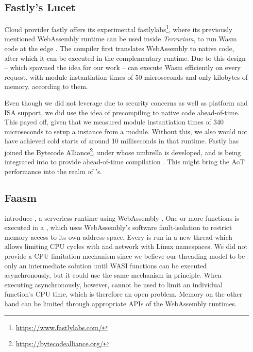 
\subsection{Fastly's Lucet}

Cloud provider fastly offers its experimental fastlylabs\footnote{\url{https://www.fastlylabs.com/}}, where its previously mentioned  WebAssembly runtime can be used inside \emph{Terrarium}, to run Wasm code at the edge \cite{fastly2019}. The  compiler first translates WebAssembly to native code, after which it can be executed in the complementary runtime. Due to this design -- which spawned the idea for our work --  can execute Wasm efficiently on every request, with module instantiation times of 50 microseconds and only kilobytes of memory, according to them.

Even though we did not leverage  due to security concerns as well as platform and ISA support, we did use the idea of precompiling to native code ahead-of-time. This payed off, given that we measured module instantiation times of 340 microseconds to setup a  instance from a module. Without this, we also would not have achieved cold starts of around 10 milliseconds in that runtime.
Fastly has joined the Bytecode Alliance\footnote{\url{https://bytecodealliance.org/}}, under whose umbrella  is developed, and  is being integrated into  to provide ahead-of-time compilation \cite{Hickey2020}. This might bring the AoT performance into the realm of 's.

\subsection{Faasm}

\citeauthor{Shillaker2020} introduce , a serverless runtime using WebAssembly \cite{Shillaker2020}. One or more functions is executed in a , which uses WebAssembly's software fault-isolation to restrict memory access to its own address space. Every  is run in a new thread which allows limiting CPU cycles with  and network with Linux namespaces.
We did not provide a CPU limitation mechanism since we believe our threading model to be only an intermediate solution until WASI functions can be executed asynchronously, but it could use the same  mechanism in principle. When executing asynchronously, however,  cannot be used to limit an individual function's CPU time, which is therefore an open problem. Memory on the other hand can be limited through appropriate APIs of the WebAssembly runtimes.

